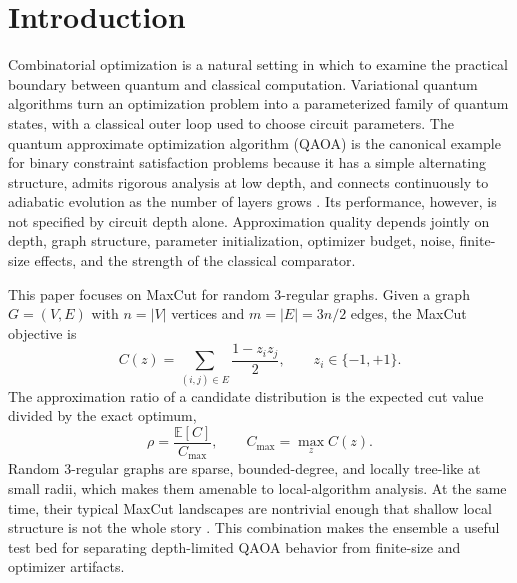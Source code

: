 \documentclass[reprint,aps,longbibliography]{revtex4-2}
\newcommand{\E}{\mathbb{E}}
\begin{document}
\section{Introduction}

Combinatorial optimization is a natural setting in which to examine the practical boundary between quantum and classical computation. Variational quantum algorithms turn an optimization problem into a parameterized family of quantum states, with a classical outer loop used to choose circuit parameters. The quantum approximate optimization algorithm (QAOA) is the canonical example for binary constraint satisfaction problems because it has a simple alternating structure, admits rigorous analysis at low depth, and connects continuously to adiabatic evolution as the number of layers grows \cite{Farhi2014QAOA,Farhi2019QAOAReview,Hadfield2019QAOA}. Its performance, however, is not specified by circuit depth alone. Approximation quality depends jointly on depth, graph structure, parameter initialization, optimizer budget, noise, finite-size effects, and the strength of the classical comparator.

This paper focuses on MaxCut for random 3-regular graphs. Given a graph $G=(V,E)$ with $n=|V|$ vertices and $m=|E|=3n/2$ edges, the MaxCut objective is
\begin{equation}
  C(z)=\sum_{(i,j)\in E}\frac{1-z_i z_j}{2},
  \qquad z_i\in\{-1,+1\}.
\end{equation}
The approximation ratio of a candidate distribution is the expected cut value divided by the exact optimum,
\begin{equation}
  \rho=\frac{\E[C]}{C_{\max}},
  \qquad
  C_{\max}=\max_z C(z).
\end{equation}
Random 3-regular graphs are sparse, bounded-degree, and locally tree-like at small radii, which makes them amenable to local-algorithm analysis. At the same time, their typical MaxCut landscapes are nontrivial enough that shallow local structure is not the whole story \cite{Dembo2017MaxCutRandomRegular,Montanari2019OptimizationRandomGraphs,Brandao2022LocalAlgorithms}. This combination makes the ensemble a useful test bed for separating depth-limited QAOA behavior from finite-size and optimizer artifacts.
\end{document}

